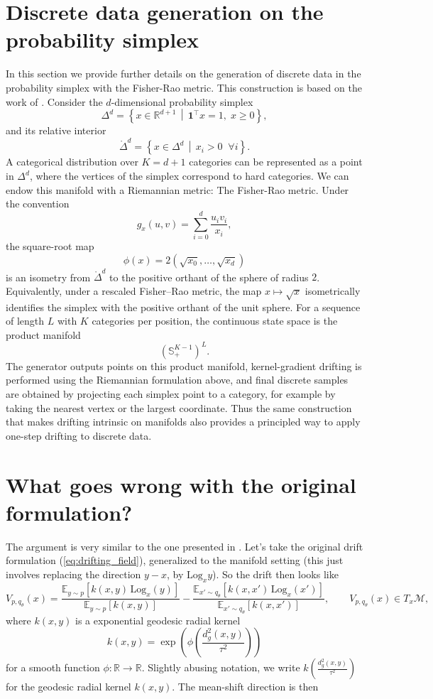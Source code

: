 \documentclass{article}
\theoremstyle{plain}
\newcommand{\M}{\mathcal{M}}
\newcommand{\Log}{\mathrm{Log}}
\begin{document}
\section{Discrete data generation on the probability simplex} \label{app: discrete generation}
In this section we provide further details on the generation of discrete data in the probability simplex with the Fisher-Rao metric. This construction is based on the work of \citep{Davis_2024_Fisher}. 
Consider the \(d\)-dimensional probability simplex
\[
\Delta^d
=
\left\{
x\in\mathbb{R}^{d+1}
\,\middle|\,
\mathbf{1}^{\top}x=1,\; x\geq 0
\right\},
\]
and its relative interior
\[
\mathring{\Delta}^d
=
\left\{
x\in\Delta^d
\,\middle|\,
x_i>0 \;\; \forall i
\right\}.
\]
A categorical distribution over \(K=d+1\) categories can be represented as a point in \(\Delta^d\), where the vertices of the simplex correspond to hard categories. We can endow this manifold with a Riemannian metric: The Fisher-Rao metric.  Under the convention
\[
g_x(u,v)
=
\sum_{i=0}^{d}
\frac{u_i v_i}{x_i},
\]
the square-root map
\[
\phi(x)
=
2\left(
\sqrt{x_0},\ldots,\sqrt{x_d}
\right)
\]
is an isometry from \(\mathring{\Delta}^d\) to the positive orthant of the sphere of radius \(2\). Equivalently, under a rescaled Fisher--Rao metric, the map \(x\mapsto \sqrt{x}\) isometrically identifies the simplex with the positive orthant of the unit sphere. For a sequence of length \(L\) with \(K\) categories per position, the continuous state space is the product manifold
\[
\left(\mathbb{S}^{K-1}_{+}\right)^L.
\]
The generator outputs points on this product manifold, kernel-gradient drifting is performed using the Riemannian formulation above, and final discrete samples are obtained by projecting each simplex point to a category, for example by taking the nearest vertex or the largest coordinate. Thus the same construction that makes drifting intrinsic on manifolds also provides a principled way to apply one-step drifting to discrete data.


\section{What goes wrong with the original formulation? } \label{app: original formulation}
The argument is very similar to the one presented in \citep{Lai_2026_Unified}. Let's take the original drift formulation (\ref{eq:drifting_field}), generalized to the manifold setting (this just involves replacing the direction $y-x$, by $\Log_xy$). So the drift then looks like 
\[V_{p,q_\theta}(x) =
\frac{
\mathbb{E}_{y \sim p}
\!\left[
k(x,y)\, \Log_{x}(y)
\right]
}{
\mathbb{E}_{y \sim p}
\!\left[
k(x,y)
\right]
}
-
\frac{
\mathbb{E}_{x' \sim q_\theta}
\!\left[
k(x,x')\, \Log_{x}(x')
\right]
}{
\mathbb{E}_{x' \sim q_\theta}
\!\left[
k(x,x')
\right]
},
\qquad
V_{p,q_\theta}(x) \in T_{x}\M, 
\] where $k(x,y)$ is a exponential geodesic radial kernel
\[
k(x, y)
=
\exp\!\left(
\phi\!\left(
\frac{d_g^2(x, y)}{\tau^2}
\right)
\right)
\]for a smooth function $\phi: \mathbb{R} \to \mathbb{R}$. Slightly abusing notation, we write $k\!\left(
\frac{d^2_g(x,y)}{\tau^2}
\right)$ for the geodesic radial kernel $k(x,y)$. The mean-shift direction is then 
\end{document}
